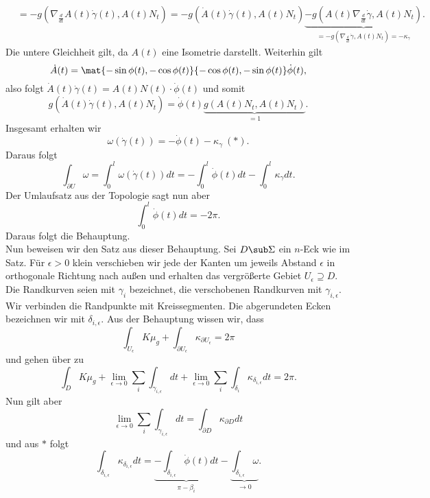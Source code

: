 \begin{beweis}
\begin{align}
&= -g(\nabla_\frac{d}{dt} A(t) \dot{\gamma}(t), A(t) N_t) = -g (\dot{A}(t) \dot{\gamma}(t), A(t) N_t) \underbrace{- g(A(t) \nabla_\frac{d}{dt} \dot{\gamma}, A(t) N_t)}_{= -g(\nabla_\frac{d}{dt} \dot{\gamma}, A(t) N_t) = - \kappa_\gamma}.
\end{align}
Die untere Gleichheit gilt, da $A(t)$ eine Isometrie darstellt. Weiterhin gilt
\begin{equation}
\dot{A}(t) = \mat{-\sin \phi(t), - \cos \phi(t)}{- \cos \phi(t), -\sin \phi(t)} \dot{\phi} (t),
\end{equation}
also folgt $\dot{A}(t) \dot{\gamma} (t) = A(t)N(t)\cdot \dot{\phi} (t)$ und somit
\begin{equation}
g(\dot{A}(t) \dot{\gamma}(t), A(t)N_t) = \dot{\phi}(t) \underbrace{g(A(t)N_t, A(t)N_t)}_{=1}.
\end{equation}
Insgesamt erhalten wir
\begin{equation}
\omega(\dot{\gamma}(t)) = - \dot{\phi}(t) - \kappa_\gamma \ (\ast).
\end{equation}
Daraus folgt
\begin{equation}
\int_{\partial U} \omega = \int_0^l \omega(\dot{\gamma}(t)) dt = - \int_0^l \dot{\phi} (t) dt - \int_0^l \kappa_\gamma dt.
\end{equation}
Der Umlaufsatz aus der Topologie sagt nun aber
\begin{equation}
\int_0^l \dot{\phi} (t) dt = - 2 \pi.
\end{equation}
Daraus folgt die Behauptung.\\
Nun beweisen wir den Satz aus dieser Behauptung. Sei $D \sub \Sigma$ ein $n$-Eck wie im Satz. Für $\epsilon > 0$ klein verschieben wir jede der Kanten um jeweils Abstand $\epsilon$ in orthogonale Richtung nach außen und erhalten das vergrößerte Gebiet $U_\epsilon \supseteq D$. Die Randkurven seien mit $\gamma_i$ bezeichnet, die verschobenen Randkurven mit $\gamma_{i,\epsilon}$. Wir verbinden die Randpunkte mit Kreissegmenten. Die abgerundeten Ecken bezeichnen wir mit $\delta_{i, \epsilon}$. Aus der Behauptung wissen wir, dass
\begin{equation}
\int_{U_\epsilon} K \mu_g + \int_{\partial U_\epsilon} \kappa_{\partial U_\epsilon} = 2\pi
\end{equation}
und gehen über zu
\begin{equation}
\int_D K \mu_g + \lim_{\epsilon \to 0} \sum_i \int_{\gamma_{i,\epsilon}} dt + \lim_{\epsilon \to 0} \sum_i \int_{\delta_i} \kappa_{\delta_{i, \epsilon}} dt = 2 \pi.
\end{equation}
Nun gilt aber
\begin{equation}
\lim_{\epsilon \to 0} \sum_i \int_{\gamma_{i,\epsilon}} dt = \int_{\partial D} \kappa_{\partial D} dt
\end{equation}
und aus $\ast$ folgt
\begin{equation}
\int_{\delta_{i, \epsilon}} \kappa_{\delta_{i, \epsilon}} dt = \underbrace{- \int_{\delta_{i, \epsilon}} \dot{\phi}(t) dt}_{\pi - \beta_i} - \underbrace{\int_{\delta_{i, \epsilon}} \omega}_{\to 0}.
\end{equation}
\end{beweis}